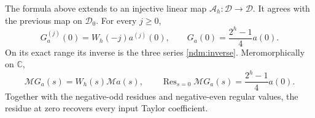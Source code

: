\begin{theorem}\label{nax:extension}
The formula above extends to an injective linear map
$\mathcal A_h:\mathcal D\to\mathcal D$. It agrees with the previous
map on $\mathcal D_0$. For every $j\geq0$,
\[
 G_a^{(j)}(0)=W_h(-j)a^{(j)}(0),\qquad
 G_a(0)=\frac{2^h-1}{4}a(0).
\]
On its exact range its inverse is the three series
\eqref{ndm:inverse}. Meromorphically on $\mathbb C$,
\begin{equation}\label{nax:mellin-product}
 \mathcal M G_a(s)=W_h(s)\mathcal M a(s),\qquad
 \operatorname{Res}_{s=0}\mathcal M G_a(s)
                  =\frac{2^h-1}{4}a(0).
\end{equation}
Together with the negative-odd residues and negative-even regular values,
the residue at zero recovers every input Taylor coefficient.
\end{theorem}
